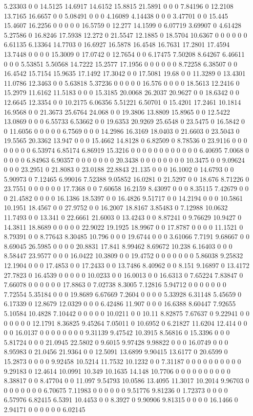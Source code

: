 5.23303 0 0 14.5125 14.6917 14.6152 15.8815 21.5891 0 0 0 7.84196 0 12.2108 13.7165 16.6657 0 0 5.08491 0 0 0 4.16089 4.14438 0 0 0 3.47701 0 0 15.445 15.4607 16.2256 0 0 0 0 0 16.5759 0 12.277 14.1599 0 6.07719 3.69907 0 4.61428 5.27586 0 16.8246 17.5938 12.272 0 21.5547 12.1885 0 18.5704 10.6367 0 0 0 0 0 0 6.61135 6.13364 14.7703 0 16.6927 16.5878 16.4548 16.7631 17.2801 17.4594 13.7448 0 0 0 0 15.3009 0 17.0742 0 12.7654 0 0 6.17475 7.50208 8.64267 6.46611 0 0 0 5.53851 5.50568 14.7222 15.2577 17.1956 0 0 0 0 0 0 8.72258 6.38507 0 0 16.4542 15.7154 15.9635 17.1492 17.3042 0 0 17.5081 19.68 0 0 11.3289 0 13.4301 11.0786 12.3463 0 0 5.63818 5.37236 0 0 0 0 0 16.576 0 0 0 0 18.5613 12.2416 0 15.2979 11.6162 11.5183 0 0 0 15.3185 20.0068 26.2037 20.9627 0 0 18.6342 0 0 12.6645 12.3354 0 0 10.2175 6.06356 5.51221 6.50701 0 15.4201 17.2461 10.1814 16.9568 0 0 21.3673 25.6764 24.068 0 0 19.3806 13.8809 15.8965 0 0 12.5422 13.0869 0 0 0 6.55733 6.53662 0 0 19.6353 20.9269 25.6548 0 23.5475 0 16.5842 0 0 11.6056 0 0 0 0 0 6.7569 0 0 0 14.2986 16.3169 18.0403 0 21.6603 0 23.5043 0 19.5565 20.3362 13.947 0 0 0 15.4662 14.8128 0 6.82509 0 8.78536 0 23.9116 0 0 0 0 0 0 0 0 6.53974 6.85174 6.86919 15.3216 0 0 0 0 0 0 0 0 0 0 0 0 6.40695 7.0068 0 0 0 0 0 6.84963 6.90357 0 0 0 0 0 0 0 20.3438 0 0 0 0 0 0 0 0 10.3475 0 0 9.09624 0 0 0 23.2951 0 21.8083 0 23.0188 22.8843 21.135 0 0 0 16.1002 0 14.6793 0 0 5.90973 0 7.12465 6.99016 7.52388 9.05852 16.0281 0 21.5297 0 0 18.676 8.71226 0 23.7551 0 0 0 0 0 0 17.7368 0 0 7.60658 16.2159 8.43097 0 0 0 8.35115 7.42679 0 0 0 21.4582 0 0 0 0 16.1386 18.5397 0 0 16.4826 9.51717 0 0 14.2194 0 0 0 10.5861 10.1951 18.4567 0 0 27.9752 0 0 16.2007 18.8167 3.85483 0 7.12988 10.0632 11.7493 0 0 13.341 0 22.6661 21.6003 0 13.4243 0 0 8.87241 0 9.76629 10.9427 0 14.3811 18.8689 0 0 0 0 0 22.9022 19.1925 18.9967 0 0 17.8787 0 0 0 0 11.1521 0 8.79391 0 0 8.77643 8.30485 10.796 0 0 0 19.6744 0 0 0 3.61066 7.7191 9.68667 0 0 8.69045 26.5985 0 0 0 0 20.8831 17.841 8.99462 8.69672 10.238 6.16403 0 0 0 8.58447 23.9577 0 0 0 16.0422 10.3809 0 0 19.4752 0 0 0 0 0 0 0 5.86038 9.25832 12.1904 0 0 0 17.4853 0 0 17.2433 0 0 13.7486 8.40962 0 0 8.151 9.16897 0 13.4172 27.7823 0 16.4539 0 0 0 0 0 10.0233 0 0 16.0013 0 0 16.6313 0 7.65224 7.83847 0 7.66078 0 0 0 0 0 0 17.8863 0 7.02738 8.3005 7.12816 5.94712 0 0 0 0 0 0 0 7.72554 5.35184 0 0 0 19.8689 6.67669 7.2604 0 0 0 0 5.33928 6.31148 5.45659 0 6.17339 0 12.8679 12.0329 0 0 0 6.42486 11.907 0 0 0 16.6388 8.60447 7.92655 5.10584 10.4828 7.10442 0 0 0 0 0 10.0211 0 0 10.11 8.82875 7.67637 0 9.22941 0 0 0 0 0 0 0 12.1791 8.36825 9.45264 7.05011 0 10.6952 0 6.21827 11.6204 12.414 0 0 0 0 16.0137 0 0 0 0 0 0 0 0 9.31139 9.47542 10.3915 8.56816 0 15.3396 0 0 0 5.81724 0 0 0 21.0945 22.5802 0 9.6015 9.97428 9.98822 0 0 0 16.0749 0 0 0 8.95983 0 21.0456 21.9364 0 0 12.5091 13.6899 9.90415 13.6177 0 20.6599 0 15.2873 0 0 0 0 9.92458 10.5214 11.7532 10.1232 0 0 7.31187 0 0 0 0 0 0 0 0 0 0 9.29183 0 12.4614 10.0991 10.349 10.1635 14.148 10.7706 0 0 0 0 0 0 0 0 0 0 8.38817 0 0 8.47704 0 0 11.097 9.54793 10.0586 13.4095 11.3017 10.2014 9.96703 0 0 0 0 0 0 0 0 6.70675 7.11983 0 0 0 0 0 0 9.51776 9.81236 0 1.72373 0 0 0 0 6.57976 6.82415 6.5391 10.4453 0 0 8.3927 0 9.90906 9.81315 0 0 0 0 16.1466 0 2.94171 0 0 0 0 0 0 6.02145 